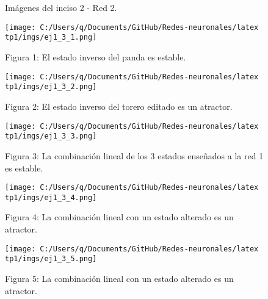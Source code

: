 \documentclass[11pt]{article} %
\begin{document}
\begin{figure}[p]
    \centering
    \\
    \\
    \caption{Imágenes del inciso 2 - Red 2.}
    \label{fig:ej2_b}
\end{figure}
\clearpage
\newpage

\begin{figure}[h!]
    \centering
    \texttt{[image: C:/Users/q/Documents/GitHub/Redes-neuronales/latex tp1/imgs/ej1\_3\_1.png]}
    \caption{Figura 1: El estado inverso del panda es estable.}
    \label{fig:ej1_3_1}
\end{figure}

\begin{figure}[h!]
    \centering
    \texttt{[image: C:/Users/q/Documents/GitHub/Redes-neuronales/latex tp1/imgs/ej1\_3\_2.png]}
    \caption{Figura 2: El estado inverso del torero editado es un atractor.}
    \label{fig:ej1_3_2}
\end{figure}

\begin{figure}[h!]
    \centering
    \texttt{[image: C:/Users/q/Documents/GitHub/Redes-neuronales/latex tp1/imgs/ej1\_3\_3.png]}
    \caption{Figura 3: La combinación lineal de los 3 estados enseñados a la red 1 es estable.}
    \label{fig:ej1_3_3}
\end{figure}

\begin{figure}[h!]
    \centering
    \texttt{[image: C:/Users/q/Documents/GitHub/Redes-neuronales/latex tp1/imgs/ej1\_3\_4.png]}
    \caption{Figura 4: La combinación lineal con un estado alterado es un atractor.}
    \label{fig:ej1_3_4}
\end{figure}

\begin{figure}[h!]
    \centering
    \texttt{[image: C:/Users/q/Documents/GitHub/Redes-neuronales/latex tp1/imgs/ej1\_3\_5.png]}
    \caption{Figura 5: La combinación lineal con un estado alterado es un atractor.}
    \label{fig:ej1_3_5}
\end{figure}
\clearpage
\newpage
\end{document}
